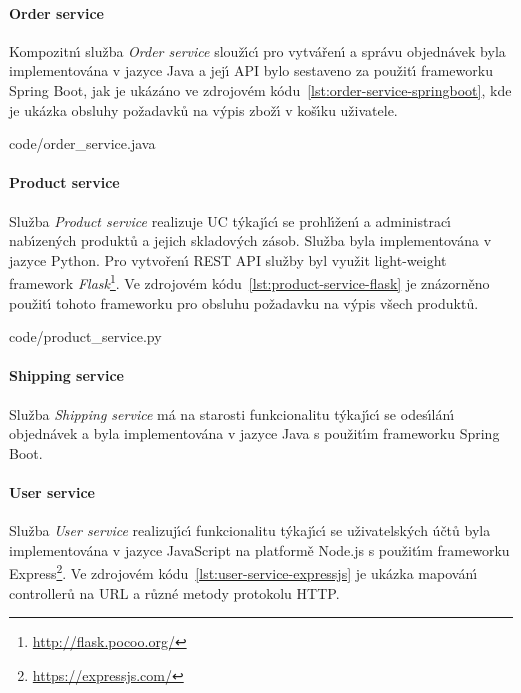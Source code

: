 \paragraph{Order service}

Kompozitn\'{\i} služba \textit{Order service} slouž\'{\i}c\'{\i} pro vytvářen\'{\i} a správu objednávek
byla implementována v jazyce Java a jej\'{\i} \gls{API} bylo sestaveno za použit\'{\i} frameworku Spring
Boot, jak je ukázáno ve zdrojovém kódu~\ref{lst:order-service-springboot}, kde
je ukázka obsluhy požadavků na v\'ypis zbož\'{\i} v koš\'{\i}ku uživatele.


{code/order_service.java}

\paragraph{Product service}

Služba \textit{Product service} realizuje \gls{UC} t\'ykaj\'{\i}c\'{\i} se
prohl\'{\i}žen\'{\i} a administrac\'{\i} nab\'{\i}zen\'ych
produktů a jejich skladov\'ych zásob. Služba byla implementována v jazyce Python.
Pro vytvořen\'{\i} \gls{REST} \gls{API} služby byl využit
light-weight framework \textit{Flask}\footnote{\url{http://flask.pocoo.org/}}.
Ve zdrojovém kódu~\ref{lst:product-service-flask} je znázorněno použit\'{\i}
tohoto frameworku pro obsluhu požadavku na v\'ypis všech produktů.


{code/product_service.py}

\paragraph{Shipping service}

Služba \textit{Shipping service} má na starosti funkcionalitu t\'ykaj\'{\i}c\'{\i} se odes\'{\i}lán\'{\i} objednávek
a byla implementována v jazyce Java s použit\'{\i}m frameworku Spring Boot.

\paragraph{User service}

Služba \textit{User service} realizuj\'{\i}c\'{\i} funkcionalitu t\'ykaj\'{\i}c\'{\i} se uživatelsk\'ych účtů byla
implementována v jazyce JavaScript na platformě Node.js s použit\'{\i}m
frameworku Express\footnote{\url{https://expressjs.com/}}. Ve zdrojovém kódu~\ref{lst:user-service-expressjs}
je ukázka mapován\'{\i} controllerů na \gls{URL}  a různé metody protokolu \gls{HTTP}.

